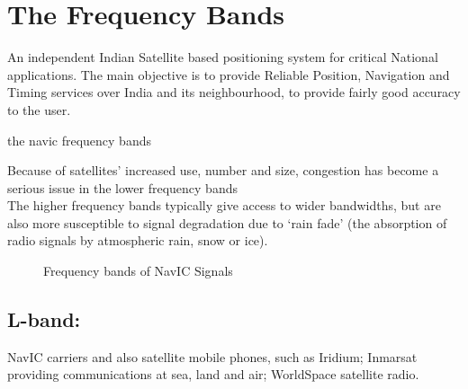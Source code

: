 




%


\section{The Frequency Bands}
An independent Indian Satellite based positioning system for critical National applications. The main objective is to provide Reliable Position, Navigation and Timing services over India and its neighbourhood, to provide fairly good accuracy to the user. 

	
	\begin{table}[h!]
	\small
	\centering
	\caption{the navic frequency bands}
	\label{table:bands}
	
	\end{table}

Because of satellites’ increased use, number and size, congestion has become a serious issue in the lower frequency bands
\\
The higher frequency bands typically give access to wider bandwidths, but are also more susceptible to signal degradation due to ‘rain fade’ (the absorption of radio signals by atmospheric rain, snow or ice).
	\begin{figure}[h!]
	\centering
	
	\caption{Frequency bands of NavIC Signals}
	\label{figure:bandsfig}
	\end{figure}	
\subsection{L-band:}
NavIC carriers and also satellite mobile phones, such as Iridium; Inmarsat providing communications at sea, land and air; WorldSpace satellite radio.

